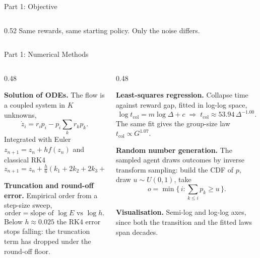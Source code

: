\documentclass[aspectratio=169,10pt]{beamer}
\begin{document}
\begin{frame}{Part 1: Objective}
\begin{columns}[T,onlytextwidth]
\begin{column}{0.52\textwidth}
\vspace{2mm}
{\scriptsize Same rewards, same starting policy. Only the noise differs.}
\end{column}
\end{columns}
\end{frame}

\begin{frame}{Part 1: Numerical Methods}

\footnotesize
\begin{columns}[T,onlytextwidth]
\begin{column}{0.48\textwidth}

\textbf{Solution of ODEs.}
The flow is a coupled system in $K$ unknowns,
\[
  \dot z_i = r_i p_i - p_i\!\sum_k r_k p_k .
\]
Integrated with Euler
$z_{n+1}=z_n+h f(z_n)$
and classical RK4
\[
  z_{n+1}=z_n+\tfrac{h}{6}(k_1+2k_2+2k_3+k_4).
\]

\medskip
\textbf{Truncation and round-off error.}
Empirical order from a step-size sweep,
\[
  \text{order}=\text{slope of }\log E \text{ vs }\log h .
\]
Below $h\approx 0.025$ the RK4 error stops falling: the truncation term has
dropped under the round-off floor.

\end{column}
\begin{column}{0.48\textwidth}

\textbf{Least-squares regression.}
Collapse time against reward gap, fitted in log-log space,
\[
  \log t_{\text{col}} = m\log\Delta + c
  \;\Rightarrow\; t_{\text{col}}\approx 53.94\,\Delta^{-1.00}.
\]
The same fit gives the group-size law $t_{\text{col}}\propto G^{1.07}$.

\medskip
\textbf{Random number generation.}
The sampled agent draws outcomes by \alert{inverse transform sampling}: build the
CDF of $p$, draw $u\sim U(0,1)$, take
\[
  o=\min\{\,i : \textstyle\sum_{k\le i}p_k \ge u\,\}.
\]

\medskip
\textbf{Visualisation.} Semi-log and log-log axes, since both the transition and
the fitted laws span decades.

\end{column}
\end{columns}
\end{frame}
\end{document}
